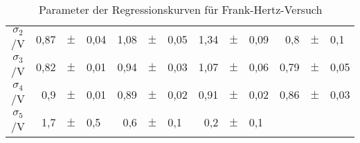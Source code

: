 \begin{table}[h]
\begin{tabular}{c | r p{0.05cm} l r p{0.05cm} l r p{0.05cm} l r p{0.05cm} l}
      $\sigma_2$/V &         0,87         &$\pm$ & 0,04     &   1,08          &$\pm$ & 0,05    & 1,34  & $\pm$ &  0,09  &  0,8  & $\pm$  & 0,1 \\ 
      $\sigma_3$/V &         0,82         &$\pm$ & 0,01      &   0,94         &$\pm$ & 0,03    & 1,07  & $\pm$ & 0,06   &   0,79 & $\pm$  & 0,05 \\ 
      $\sigma_4$/V &        0,9          &$\pm$ & 0,01    &   0,89         &$\pm$ & 0,02    &  0,91 & $\pm$ &  0,02  &  0,86  & $\pm$  & 0,03 \\ 
      $\sigma_5$/V &         1,7          &$\pm$ & 0,5      &   0,6         &$\pm$ & 0,1     & 0,2  & $\pm$ & 0,1   &    &   &  \\ 
      \bottomrule
    \end{tabular}
    \caption{Parameter der Regressionskurven für Frank-Hertz-Versuch}
    \label{tab:fh_parameter_1}
  \end{table}

